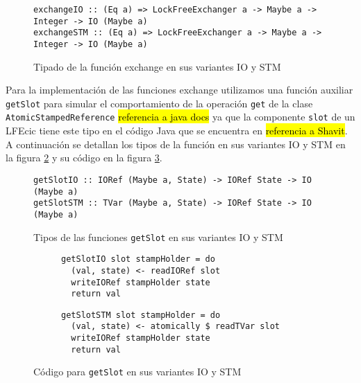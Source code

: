 \begin{figure}[H]
  \centering
  \begin{verbatim}
exchangeIO :: (Eq a) => LockFreeExchanger a -> Maybe a -> Integer -> IO (Maybe a)
exchangeSTM :: (Eq a) => LockFreeExchanger a -> Maybe a -> Integer -> IO (Maybe a)
  \end{verbatim}
  \caption{Tipado de la función exchange en sus variantes IO y STM}
  \label{fig:exchange-types}
\end{figure}

Para la implementación de las funciones exchange utilizamos una función auxiliar \texttt{getSlot} para simular el comportamiento de la operación \texttt{get} de la clase \texttt{AtomicStampedReference}  \hl{referencia a java docs} ya que la componente \texttt{slot} de un LFEcic tiene este tipo en el código Java que se encuentra en \hl{referencia a Shavit}. A continuación se detallan los tipos de la función en sus variantes IO y STM en la figura \ref{fig:getSlot-types} y su código en la figura \ref{fig:getSlot-code}.

\begin{figure}[H]
  \centering
  \begin{verbatim}
getSlotIO :: IORef (Maybe a, State) -> IORef State -> IO (Maybe a)
getSlotSTM :: TVar (Maybe a, State) -> IORef State -> IO (Maybe a)
  \end{verbatim}
  \caption{Tipos de las funciones \texttt{getSlot} en sus variantes IO y STM}
  \label{fig:getSlot-types}
\end{figure}

\begin{figure}[H]
  \centering
    \begin{subfigure}[b]{0.4\textwidth}
    \begin{verbatim}
getSlotIO slot stampHolder = do
  (val, state) <- readIORef slot
  writeIORef stampHolder state
  return val
    \end{verbatim}
  \end{subfigure}
  \begin{subfigure}[b]{0.5\textwidth}
    \begin{verbatim}
getSlotSTM slot stampHolder = do
  (val, state) <- atomically $ readTVar slot
  writeIORef stampHolder state
  return val
    \end{verbatim}
  \end{subfigure}
  \caption{Código para \texttt{getSlot} en sus variantes IO y STM}
  \label{fig:getSlot-code}
\end{figure}

